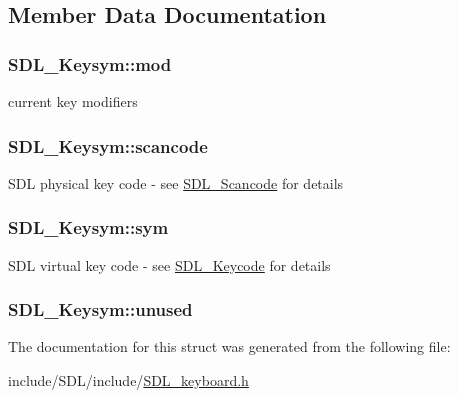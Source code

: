 \subsection{Member Data Documentation}
\hypertarget{struct_s_d_l___keysym_ab519d1b8a9939d3d035f7103f3208291}{
\subsubsection[{mod}]{ S\-D\-L\-\_\-\-Keysym\-::mod}}\label{struct_s_d_l___keysym_ab519d1b8a9939d3d035f7103f3208291}
current key modifiers \hypertarget{struct_s_d_l___keysym_ad47e9120a511e2efc7ec0c6d8a5ec51e}{
\subsubsection[{scancode}]{ S\-D\-L\-\_\-\-Keysym\-::scancode}}\label{struct_s_d_l___keysym_ad47e9120a511e2efc7ec0c6d8a5ec51e}
S\-D\-L physical key code -\/ see \hyperlink{_s_d_l__scancode_8h_a82ab7cff701034fb40a47b5b3a02777b}{S\-D\-L\-\_\-\-Scancode} for details \hypertarget{struct_s_d_l___keysym_a082ff1fd787b79fa6c3a445deb225f08}{
\subsubsection[{sym}]{ S\-D\-L\-\_\-\-Keysym\-::sym}}\label{struct_s_d_l___keysym_a082ff1fd787b79fa6c3a445deb225f08}
S\-D\-L virtual key code -\/ see \hyperlink{_s_d_l__keycode_8h_ae9265f064f13f0f74dfca26a67875171}{S\-D\-L\-\_\-\-Keycode} for details \hypertarget{struct_s_d_l___keysym_ab1d0a50cc619966fb06b92e15cc46dd9}{
\subsubsection[{unused}]{ S\-D\-L\-\_\-\-Keysym\-::unused}}\label{struct_s_d_l___keysym_ab1d0a50cc619966fb06b92e15cc46dd9}


The documentation for this struct was generated from the following file\-:\begin{DoxyCompactItemize}
\item 
include/\-S\-D\-L/include/\hyperlink{_s_d_l__keyboard_8h}{S\-D\-L\-\_\-keyboard.\-h}\end{DoxyCompactItemize}
